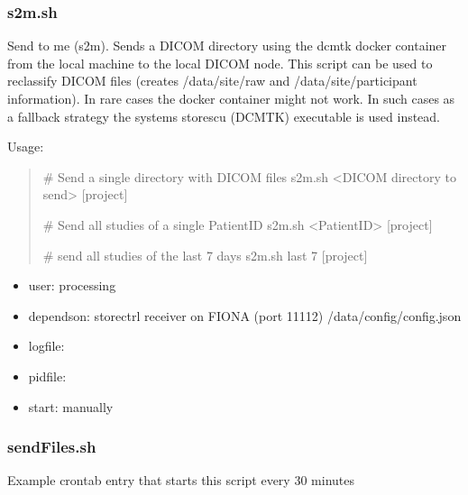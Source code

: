 \documentclass[letterpaper,10pt,english]{sphinxmanual}
\begin{document}
\sphinxstepscope


\subsubsection{s2m.sh}
\label{\detokenize{Architecture/scripts/s2m:s2m-sh}}\label{\detokenize{Architecture/scripts/s2m::doc}}
\sphinxAtStartPar
Send to me (s2m). Sends a DICOM directory using the dcmtk docker container from the local machine to the local DICOM node. This script can be used to re\sphinxhyphen{}classify DICOM files (creates /data/site/raw and /data/site/participant information). In rare cases the docker container might not work. In such cases as a fall\sphinxhyphen{}back strategy the systems storescu (DCMTK) executable is used instead.

\sphinxAtStartPar
Usage:
\begin{quote}

\sphinxAtStartPar
\# Send a single directory with DICOM files
s2m.sh \textless{}DICOM directory to send\textgreater{} {[}project{]}

\sphinxAtStartPar
\# Send all studies of a single PatientID
s2m.sh \textless{}PatientID\textgreater{} {[}project{]}

\sphinxAtStartPar
\# send all studies of the last 7 days
s2m.sh last 7 {[}project{]}
\end{quote}
\begin{itemize}
\item {} 
\sphinxAtStartPar
user: processing

\item {} 
\sphinxAtStartPar
depends\sphinxhyphen{}on:
\sphinxhyphen{} storectrl receiver on FIONA (port 11112)
\sphinxhyphen{} /data/config/config.json

\item {} 
\sphinxAtStartPar
log\sphinxhyphen{}file:

\item {} 
\sphinxAtStartPar
pid\sphinxhyphen{}file:

\item {} 
\sphinxAtStartPar
start: manually

\end{itemize}

\sphinxstepscope


\subsubsection{sendFiles.sh}
\label{\detokenize{Architecture/scripts/sendFiles:sendfiles-sh}}\label{\detokenize{Architecture/scripts/sendFiles::doc}}
\sphinxAtStartPar
Example crontab entry that starts this script every 30 minutes
\end{document}
